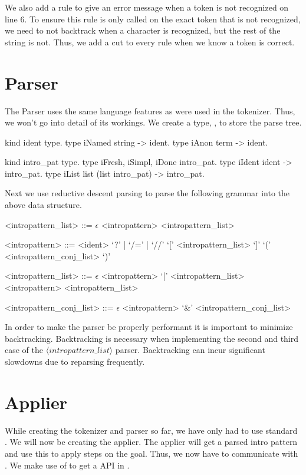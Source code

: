 \documentclass[thesis.tex]{subfiles}
\begin{document}
{{We also add a rule to give an error message when a token is not recognized on line 6. To ensure this rule is only called on the exact token that is not recognized, we need to not backtrack when a character is recognized, but the rest of the string is not. Thus, we add a cut to every rule when we know a token is correct.

\section{Parser}\label{ssec:parser}
The Parser uses the same language features as were used in the tokenizer. Thus, we won't go into detail of its workings. We create a type, , to store the parse tree.
\begin{elpicode}
  kind ident type.
  type iNamed string -> ident.
  type iAnon term -> ident.

  kind intro_pat type.
  type iFresh, iSimpl, iDone intro_pat.
  type iIdent ident -> intro_pat.
  type iList list (list intro_pat) -> intro_pat.
\end{elpicode}
Next we use reductive descent parsing to parse the following grammar into the above data structure.
\begin{grammar}
  <intropattern\_list> ::= $\epsilon$
  \alt <intropattern> <intropattern\_list>

  <intropattern> ::= <ident>
  \alt `?' | `/=' | `//'
  \alt `[' <intropattern\_list> `]'
  \alt `(' <intropattern\_conj\_list> `)'

  <intropattern\_list> ::= $\epsilon$
  \alt <intropattern> `|' <intropattern\_list>
  \alt <intropattern> <intropattern\_list>

  <intropattern\_conj\_list> ::= $\epsilon$
  \alt <intropattern> `&' <intropattern\_conj\_list>
\end{grammar}
In order to make the parser be properly performant it is important to minimize backtracking. Backtracking is necessary when implementing the second and third case of the $\langle intropattern\_list\rangle$ parser. Backtracking can incur significant slowdowns due to reparsing frequently.

\section{Applier}\label{ssec:applier}
While creating the tokenizer and parser so far, we have only had to use standard \elpi. We will now be creating the applier. The applier will get a parsed intro pattern and use this to apply steps on the goal. Thus, we now have to communicate with \coq. We make use of \ce \cite{tassiElpiExtensionLanguage2018} to get a \coq API in \elpi.

}}
\end{document}
